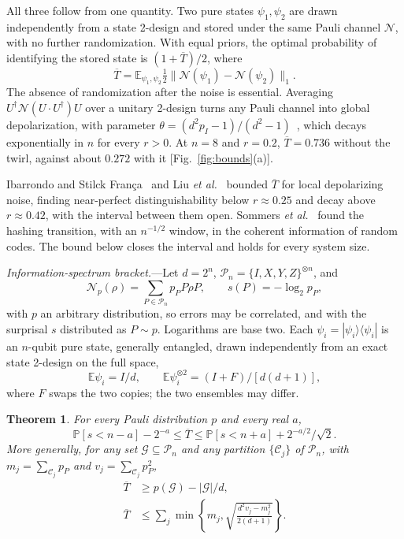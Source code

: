 \documentclass[aps,prl,reprint,superscriptaddress,amsmath,amssymb]{revtex4-2}
\newtheorem{theorem}{Theorem}
\newcommand{\E}{\mathbb E}
\newcommand{\Tb}{\overline T}
\newcommand{\N}{\mathcal N}
\newcommand{\prob}{\mathbb P}
\begin{document}
All three follow from one quantity. Two pure states $\psi_1,\psi_2$ are drawn
independently from a state 2-design and stored under the same Pauli channel
$\N$, with no further randomization. With equal priors, the optimal probability
of identifying the stored state is $(1+\Tb)/2$, where
\begin{equation}
\Tb=\E_{\psi_1,\psi_2}\tfrac12\|\N(\psi_1)-\N(\psi_2)\|_1 .
\label{eq:observable}
\end{equation}
The absence of randomization after the noise is essential. Averaging
$U^\dagger\N(U\cdot U^\dagger)U$ over a unitary 2-design turns any Pauli channel
into global depolarization, with parameter
$\theta=(d^2p_I-1)/(d^2-1)$~\cite{Dankert}, which decays exponentially in $n$ for
every $r>0$. At $n=8$ and $r=0.2$, $\Tb=0.736$ without the twirl, against about
$0.272$ with it [Fig.~\ref{fig:bounds}(a)].

Ibarrondo and Stilck Fran\c{c}a~\cite{Ibarrondo} and Liu \emph{et al.}~\cite{Liu}
bounded $\Tb$ for local depolarizing noise, finding near-perfect
distinguishability below $r\approx0.25$ and decay above $r\approx0.42$, with the
interval between them open. Sommers \emph{et al.}~\cite{Sommers} found the hashing
transition, with an $n^{-1/2}$ window, in the coherent information of random
codes. The bound below closes the interval and holds for every system size.

\emph{Information-spectrum bracket.}---Let $d=2^n$,
$\mathcal P_n=\{I,X,Y,Z\}^{\otimes n}$, and
\begin{equation}
\N_p(\rho)=\sum_{P\in\mathcal P_n}p_PP\rho P,\qquad s(P)=-\log_2p_P,
\label{eq:channel}
\end{equation}
with $p$ an arbitrary distribution, so errors may be correlated, and with the
surprisal $s$ distributed as $P\sim p$. Logarithms are base two. Each
$\psi_i=|\psi_i\rangle\langle\psi_i|$ is an $n$-qubit pure state, generally
entangled, drawn independently from an exact state 2-design on the full space,
\begin{equation}
\E\psi_i=I/d,\qquad\E\psi_i^{\otimes2}=(I+F)/[d(d+1)],
\label{eq:design}
\end{equation}
where $F$ swaps the two copies; the two ensembles may differ.

\begin{theorem}
For every Pauli distribution $p$ and every real $a$,
\begin{equation}
\prob[s<n-a]-2^{-a}\le\Tb\le\prob[s<n+a]+2^{-a/2}/\sqrt2 .
\label{eq:spectrum}
\end{equation}
More generally, for any set $\mathcal G\subseteq\mathcal P_n$ and any partition
$\{\mathcal C_j\}$ of $\mathcal P_n$, with $m_j=\sum_{\mathcal C_j}p_P$ and
$v_j=\sum_{\mathcal C_j}p_P^2$,
\begin{align}
\Tb&\ge p(\mathcal G)-|\mathcal G|/d,\label{eq:lower}\\
\Tb&\le\sum_j\min\left\{m_j,\sqrt{\frac{d^2v_j-m_j^2}{2(d+1)}}\right\}.
\label{eq:upper}
\end{align}
\end{theorem}
\end{document}
